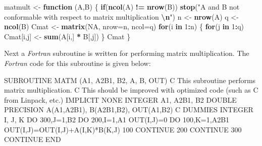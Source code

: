 \documentclass[
]{book}
\newenvironment{Shaded}{\begin{snugshade}}{\end{snugshade}}
\newcommand{\AttributeTok}[1]{\textcolor[rgb]{0.13,0.29,0.53}{#1}}
\newcommand{\ConstantTok}[1]{\textcolor[rgb]{0.56,0.35,0.01}{#1}}
\newcommand{\ControlFlowTok}[1]{\textcolor[rgb]{0.13,0.29,0.53}{\textbf{#1}}}
\newcommand{\DecValTok}[1]{\textcolor[rgb]{0.00,0.00,0.81}{#1}}
\newcommand{\FunctionTok}[1]{\textcolor[rgb]{0.13,0.29,0.53}{\textbf{#1}}}
\newcommand{\NormalTok}[1]{#1}
\newcommand{\OtherTok}[1]{\textcolor[rgb]{0.56,0.35,0.01}{#1}}
\newcommand{\SpecialCharTok}[1]{\textcolor[rgb]{0.81,0.36,0.00}{\textbf{#1}}}
\newcommand{\StringTok}[1]{\textcolor[rgb]{0.31,0.60,0.02}{#1}}
\begin{document}
\begin{Shaded}
\begin{Highlighting}[]
\NormalTok{matmult }\OtherTok{\textless{}{-}} \ControlFlowTok{function}\NormalTok{ (A,B) }
\NormalTok{ \{ }\ControlFlowTok{if}\NormalTok{(}\FunctionTok{ncol}\NormalTok{(A) }\SpecialCharTok{!=} \FunctionTok{nrow}\NormalTok{(B)) }\FunctionTok{stop}\NormalTok{(}\StringTok{"A and B not conformable with                 }
\StringTok{                       respect to matrix multiplication }\SpecialCharTok{\textbackslash{}n}\StringTok{"}\NormalTok{)}
\NormalTok{   n }\OtherTok{\textless{}{-}} \FunctionTok{nrow}\NormalTok{(A)}
\NormalTok{   q }\OtherTok{\textless{}{-}} \FunctionTok{ncol}\NormalTok{(B)}
\NormalTok{   Cmat }\OtherTok{\textless{}{-}} \FunctionTok{matrix}\NormalTok{(}\ConstantTok{NA}\NormalTok{, }\AttributeTok{nrow=}\NormalTok{n, }\AttributeTok{ncol=}\NormalTok{q)}
   \ControlFlowTok{for}\NormalTok{(i }\ControlFlowTok{in} \DecValTok{1}\SpecialCharTok{:}\NormalTok{n)}
\NormalTok{      \{ }\ControlFlowTok{for}\NormalTok{(j }\ControlFlowTok{in} \DecValTok{1}\SpecialCharTok{:}\NormalTok{q) Cmat[i,j] }\OtherTok{\textless{}{-}} \FunctionTok{sum}\NormalTok{(A[i,] }\SpecialCharTok{*}\NormalTok{ B[,j])}
\NormalTok{      \}}
\NormalTok{  Cmat}
\NormalTok{  \}}
\end{Highlighting}
\end{Shaded}

Next a \emph{{Fortran}} subroutine is written for performing matrix multiplication. The \emph{{Fortran}} code for this subroutine is given below:

\begin{Shaded}
\begin{Highlighting}[]
\NormalTok{      SUBROUTINE MATM (A1, A2B1, B2, A, B, OUT)}
\NormalTok{C     This subroutine performs matrix multiplication.}
\NormalTok{C     This should be improved with optimized code (such as }
\NormalTok{C     from Linpack, etc.)}
\NormalTok{      IMPLICIT NONE}
\NormalTok{      INTEGER A1, A2B1, B2}
\NormalTok{      DOUBLE PRECISION A(A1,A2B1), B(A2B1,B2), OUT(A1,B2)}
\NormalTok{C     DUMMIES}
\NormalTok{      INTEGER I, J, K}
\NormalTok{      DO 300,J=1,B2}
\NormalTok{        DO 200,I=1,A1}
\NormalTok{          OUT(I,J)=0}
\NormalTok{          DO 100,K=1,A2B1}
\NormalTok{            OUT(I,J)=OUT(I,J)+A(I,K)*B(K,J)}
\NormalTok{100   CONTINUE}
\NormalTok{200   CONTINUE}
\NormalTok{300   CONTINUE}
\NormalTok{      END}
\end{Highlighting}
\end{Shaded}
\end{document}
